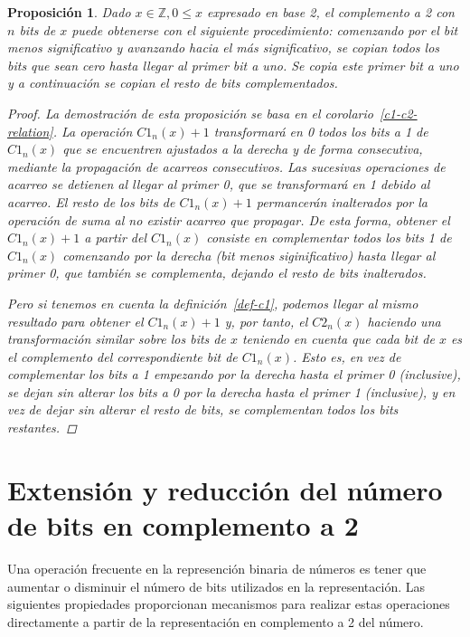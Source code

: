 \documentclass[spanish,a4paper,12pt,titlepage]{article}
\newtheorem{proposition}[theorem]{Proposición}
\theoremstyle{definition}
\theoremstyle{remark}
\newcommand{\bbZ}{\mathbb{Z}}
\begin{document}
\begin{proposition}
  Dado $x \in \bbZ, 0 \le x$ expresado en base 2, el complemento a 2 con $n$ bits de $x$ puede obtenerse con el siguiente procedimiento: comenzando por el bit menos significativo y avanzando hacia el más significativo, se copian todos los bits que sean cero hasta llegar al primer bit a uno. Se copia este primer bit a uno y a continuación se copian el resto de bits complementados.
  \begin{proof}
    La demostración de esta proposición se basa en el corolario~\ref{c1-c2-relation}. La operación $C1_n(x)+1$ transformará en 0 todos los bits a 1 de $C1_n(x)$ que se encuentren ajustados a la derecha y de forma consecutiva, mediante la propagación de acarreos consecutivos. Las sucesivas operaciones de acarreo se detienen al llegar al primer 0, que se transformará en 1 debido al acarreo. El resto de los bits de $C1_n(x)+1$ permancerán inalterados por la operación de suma al no existir acarreo que propagar. De esta forma, obtener el $C1_n(x)+1$ a partir del $C1_n(x)$ consiste en complementar todos los bits 1 de $C1_n(x)$ comenzando por la derecha (bit menos siginificativo) hasta llegar al primer 0, que también se complementa, dejando el resto de bits inalterados.

    Pero si tenemos en cuenta la definición~\ref{def-c1}, podemos llegar al mismo resultado para obtener el $C1_n(x)+1$ y, por tanto, el $C2_n(x)$ haciendo una transformación similar sobre los bits de $x$ teniendo en cuenta que cada bit de $x$ es el complemento del correspondiente bit de $C1_n(x)$. Esto es, en vez de complementar los bits a 1 empezando por la derecha hasta el primer 0 (inclusive), se dejan sin alterar los bits a 0 por la derecha hasta el primer 1 (inclusive), y en vez de dejar sin alterar el resto de bits, se complementan todos los bits restantes.
  \end{proof}
\end{proposition}

\section{Extensión y reducción del número de bits en complemento a 2}

Una operación frecuente en la represención binaria de números es tener que aumentar o disminuir el número de bits utilizados en la representación. Las siguientes propiedades proporcionan mecanismos para realizar estas operaciones directamente a partir de la representación en complemento a 2 del número.
\end{document}
